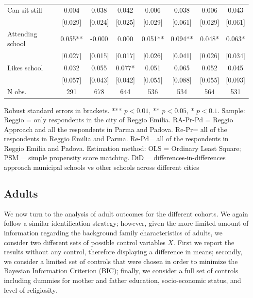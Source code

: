 \documentclass[12pt]{article}
\begin{document}
\begin{table}[ht]
\begin{center}
\begin{adjustbox}{width=1.2\textwidth,center=\textwidth}
\begin{tabular}{lccccccc}
{Can sit still } & {0.004 } & {0.038 } & {0.042 } & {0.006 } & {0.038 } & {0.006 } & {0.043 }\\
 & [0.029] & [0.024] & [0.025] & [0.029] & [0.061] & [0.029] & [0.061]\\
{Attending school } & {0.055{*}{*} } & {-0.000 } & {0.000 } & {0.051{*}{*} } & {0.094{*}{*} } & {0.048{*} } & {0.063{*} }\\
 & [0.027] & [0.015] & [0.017] & [0.026] & [0.041] & [0.026] & [0.034]\\
{Likes school } & {0.032 } & {0.055 } & {0.077{*} } & {0.051 } & {0.065 } & {0.052 } & {0.045 }\\
 & [0.057] & [0.043] & [0.042] & [0.055] & [0.088] & [0.055] & [0.093]\\
\hline 
{N obs. } & {291 } & {678 } & {644 } & {536 } & {534 } & {564 } & {531 }\\
\hline 
\end{tabular}
\end{adjustbox}
\end{center}

\begin{footnotesize}
\raggedright{Robust standard errors in brackets. *** $p<0.01$, ** $p<0.05$, * $p<0.1$. Sample: Reggio = only respondents in the city of Reggio Emilia. RA-Pr-Pd = Reggio Approach and all the respondents in Parma and Padova. Re-Pr= all of the respondents in Reggio Emilia and Parma. Re-Pd= all of the respondents in Reggio Emilia and Padova. Estimation method: OLS = Ordinary Least Square; PSM = simple propensity score matching. DiD = differences-in-differences approach municipal schools vs other schools across different cities}
\end{footnotesize}
\end{table}

\subsection{Adults}
We now turn to the analysis of adult outcomes for the different cohorts. We again follow a similar identification strategy; however, given the more limited amount of information regarding the background family characteristics of adults, we consider two different sets of possible control variables $X$. First we report the results without any control, therefore displaying a difference in means; secondly, we consider a limited set of controls that were chosen in order to minimize the Bayesian Information Criterion (BIC); finally, we consider a full set of controls including dummies for mother and father education, socio-economic status, and level of religiosity.
\end{document}
